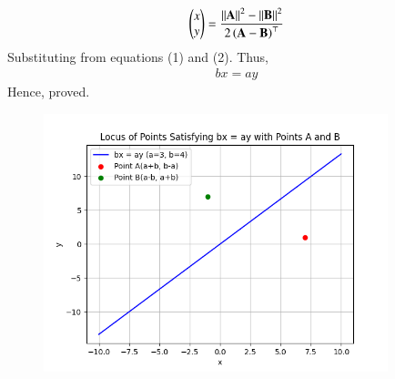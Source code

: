 \documentclass[journal]{IEEEtran}
\begin{document}
\begin{enumerate}
\begin{align}
    \begin{pmatrix}x\\y\end{pmatrix} = \frac{\left\vert\left\vert\mathbf{A}\right\vert\right\vert^2 - \left\vert\left\vert\mathbf{B}\right\vert\right\vert^2}{2\left(\mathbf{A}-\mathbf{B}\right)^\top}
\end{align}
Substituting from equations (1) and (2). Thus,
\begin{align}
    bx = ay
\end{align}
Hence, proved.
\begin{figure}[htp]
    \centering
    \includegraphics[width=10cm]{figs/figure.png}
    \label{fig:figure}
\end{figure}
\end{enumerate}
\end{document}
